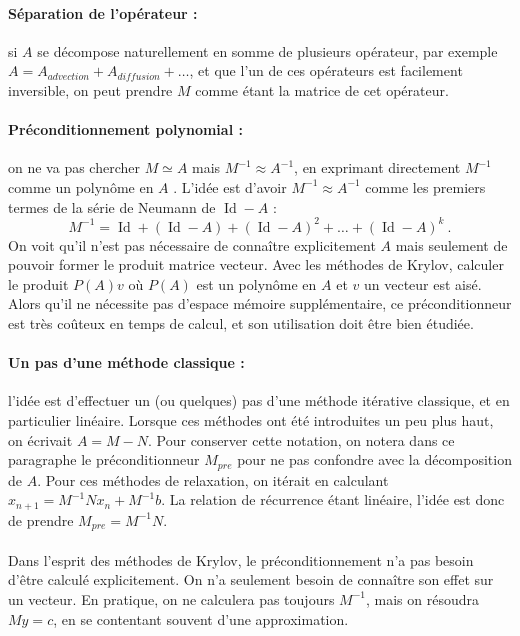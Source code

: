 		\paragraph{Séparation de l'opérateur :}
		si $A$ se décompose naturellement en somme de plusieurs opérateur, par exemple $A = A_{advection} + A_{diffusion} + \dots$, et que l'un de ces opérateurs est facilement inversible,
		on peut prendre $M$ comme étant la matrice de cet opérateur.

		\paragraph{Préconditionnement polynomial :}
		on ne va pas chercher $M\simeq A$ mais $M^{-1} \approx A^{-1}$, en exprimant directement $M^{-1}$ comme un polynôme en $A$ \cite{DuboisGreenbaumRodrigue1979}.
		L'idée est d'avoir $M^{-1} \approx A^{-1}$ comme les premiers termes de la série de Neumann de $\operatorname{Id} - A$ :
		\[M^{-1}=\operatorname{Id}+\left(\operatorname{Id}-A\right)+\left(\operatorname{Id}-A\right)^2 + \dots+\left(\operatorname{Id}-A\right)^k\ .\]
		On voit qu'il n'est pas nécessaire de connaître explicitement $A$ mais seulement de pouvoir former le produit matrice vecteur.
		Avec les méthodes de Krylov, calculer le produit $P\left(A\right)v$ où $P\left(A\right)$ est un polynôme en $A$ et $v$ un vecteur est aisé.
		Alors qu'il ne nécessite pas d'espace mémoire supplémentaire, ce préconditionneur est très coûteux en temps de calcul, et son utilisation doit être bien étudiée.

		\paragraph{Un pas d'une méthode classique :}
		l'idée est d'effectuer un (ou quelques) pas d'une méthode itérative classique, et en particulier linéaire.
		Lorsque ces méthodes ont été introduites un peu plus haut, on écrivait $A = M - N$.
		Pour conserver cette notation, on notera dans ce paragraphe le préconditionneur $M_{pre}$ pour ne pas confondre avec la décomposition de $A$.
		Pour ces méthodes de relaxation, on itérait en calculant $x_{n+1} = M^{-1}Nx_n + M^{-1}b$.
    La relation de récurrence étant linéaire, l'idée est donc de prendre $M_{pre} = M^{-1}N$.

		\paragraph{}
		Dans l'esprit des méthodes de Krylov, le préconditionnement n'a pas besoin d'être calculé explicitement.
		On n'a seulement besoin de connaître son effet sur un vecteur.
		En pratique, on ne calculera pas toujours $M^{-1}$, mais on résoudra $My = c$, en se contentant souvent d’une approximation.


